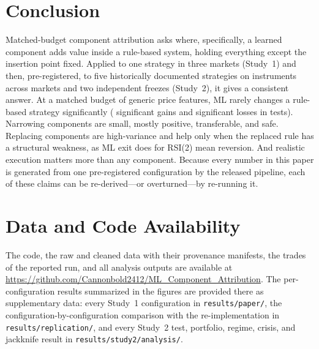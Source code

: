\section{Conclusion}
\label{sec:conclusion}

Matched-budget component attribution asks where, specifically, a learned component adds value inside a rule-based
system, holding everything except the insertion point fixed. Applied to one strategy in three markets (Study~1) and
then, pre-registered, to five historically documented strategies on \STwoInstruments{} instruments across
\STwoMarkets{} markets and two independent freezes (Study~2), it gives a consistent answer. At a matched budget of
generic price features, ML rarely changes a rule-based strategy significantly (\STwoMktSigGain{} significant gains and
\STwoMktSigLoss{} significant losses in \STwoMktTests{} tests). Narrowing components are small, mostly positive,
transferable, and safe. Replacing components are high-variance and help only when the replaced rule has a structural
weakness, as ML exit does for RSI(2) mean reversion. And realistic execution matters more than any component. Because
every number in this paper is generated from one pre-registered configuration by the released pipeline, each of these
claims can be re-derived---or overturned---by re-running it.

\section*{Data and Code Availability}

The code, the raw and cleaned data with their provenance manifests, the trades of the reported run, and all analysis
outputs are available at \url{https://github.com/Cannonbold2412/ML_Component_Attribution}. The per-configuration
results summarized in the figures are provided there as supplementary data: every Study~1 configuration in
\texttt{results/paper/}, the configuration-by-configuration comparison with the re-implementation in
\texttt{results/replication/}, and every Study~2 test, portfolio, regime, crisis, and jackknife result in
\texttt{results/study2/analysis/}.
